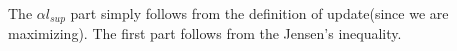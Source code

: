 \begin{answer}
The $\alpha l_{sup}$ part simply follows from the definition of update(since we are maximizing). The first part follows from the Jensen's inequality.


 \end{answer}
